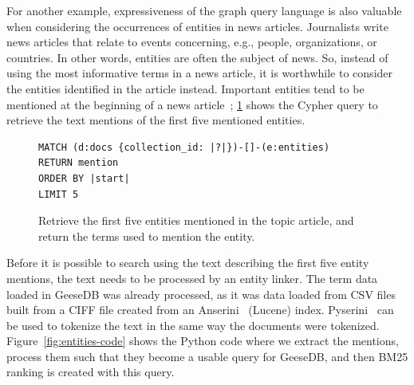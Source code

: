 For another example, expressiveness of the graph query language is also valuable when considering the occurrences of entities in news articles. Journalists write news articles that relate to events concerning, e.g., people, organizations, or countries. In other words, entities are often the subject of news. So, instead of using the most informative terms in a news article, it is worthwhile to consider the entities identified in the article instead. Important entities tend to be mentioned at the beginning of a news article~\citep{trec-2019}; \cref{fig:entity-cypher} shows the Cypher query to retrieve the text mentions of the first five mentioned entities.

\begin{figure}
	\begin{verbatim}
MATCH (d:docs {collection_id: |?|})-[]-(e:entities)
RETURN mention
ORDER BY |start|
LIMIT 5
	\end{verbatim}
	\caption{Retrieve the first five entities mentioned in the topic article, and return the terms used to mention the entity.}
	\label{fig:entity-cypher}
\end{figure}
\noindent Before it is possible to search using the text describing the first five entity mentions, the text needs to be processed by an entity linker. The term data loaded in GeeseDB was already processed, as it was data loaded from CSV files built from a CIFF file created from an Anserini~\citep{anserini} (Lucene) index. Pyserini~\citep{pyserini} can be used to tokenize the text in the same way the documents were tokenized. Figure~\ref{fig:entities-code} shows the Python code where we extract the mentions, process them such that they become a usable query for GeeseDB, and then BM25 ranking is created with this query.

